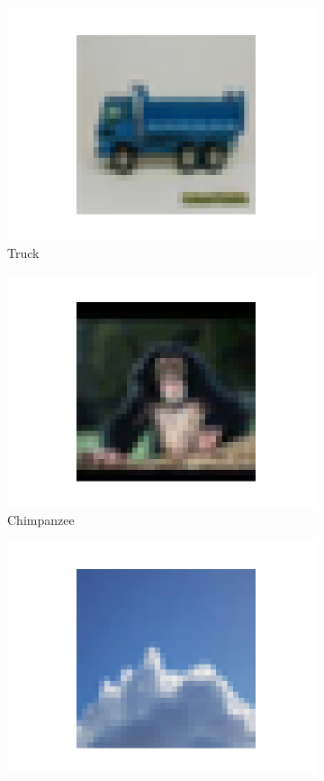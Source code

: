 \documentclass[letterpaper]{article} %
\begin{document}
\begin{figure}[htbp]
\begin{subfigure}{0.115\textwidth}
  \includegraphics[width=\linewidth]{cifar-10_9.png}
  \caption{Truck}
\end{subfigure}
\begin{subfigure}{0.115\textwidth}
  \includegraphics[width=\linewidth]{cifar-100_21.png}
  \caption{Chimpanzee}
\end{subfigure}\hfil
\begin{subfigure}{0.115\textwidth}
  \includegraphics[width=\linewidth]{cifar-100_23.png}

\end{subfigure}
\end{figure}
\end{document}
